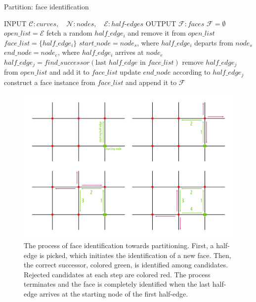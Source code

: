 \begin{algorithm}
  \caption {Partition: face identification}
  \label{alg:partitioning}
  \begin{algorithmic}
    \STATE INPUT  $\mathcal{C}:curves, \quad \mathcal{N}:nodes, \quad \mathcal{E}:half\text{-}edges$
    \STATE OUTPUT  $\mathcal{F}:faces$
    \STATE \quad
    \STATE $\mathcal{F} = \emptyset$
    \STATE $open\_list = \mathcal{E}$
    \STATE fetch a random $half\_edge_i$ and remove it from $open\_list$
    \STATE $face\_list = \{ half\_edge_i\}$
    \STATE $start\_node = node_s$, where $half\_edge_i$ departs from $node_s$
    \STATE $end\_node = node_e$, where $half\_edge_i$ arrives at $node_e$
    \STATE $half\_edge_j= \mathit{find\_successor} \left( \text{last } half\_edge \text{ in } face\_list \right)$
    \STATE remove $half\_edge_j$ from $open\_list$ and add it to $face\_list$
    \STATE update $end\_node$ according to $half\_edge_j$
    \ENDWHILE
    \STATE construct a face instance from $face\_list$ and append it to $\mathcal{F}$
    \ENDWHILE
  \end{algorithmic}
\end{algorithm}

\begin{figure} %
    \centering
    \includegraphics[width=1.\textwidth]{figures/subd_pathFollower.png}
    \caption{The process of face identification towards partitioning.
      First, a half-edge is picked, which initiates the identification of a new face.
      Then, the correct successor, colored green, is identified among candidates.
      Rejected candidates at each step are colored red.
      The process terminates and the face is completely identified when the last half-edge arrives at the starting node of the first half-edge.}
    \label{fig:subd_pathFollower}
\end{figure}

